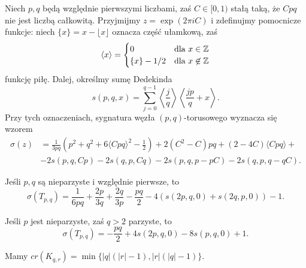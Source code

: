 \begin{proposition}
    Niech $p, q$ będą względnie pierwszymi liczbami, zaś $C \in [0, 1)$ stałą taką, że $Cpq$ nie jest liczbą całkowitą.
    Przyjmijmy $z = \exp (2 \pi i C)$ i zdefinujmy pomocnicze funkcje: niech $\{x\} = x - \lfloor x \rfloor$ oznacza część ułamkową, zaś
    \begin{equation}
        \langle x \rangle = \begin{cases}
            0 & \text{dla } x \in \mathbb Z \\
            \{x\} - 1/2 & \text{dla } x \not \in \mathbb Z
        \end{cases}
    \end{equation}
    funkcję piłę.
    Dalej, określmy sumę Dedekinda
    \begin{equation}
        s(p, q, x) = \sum_{j = 0}^{q-1} \left\langle \frac {j}{q} \right\rangle \left\langle \frac {jp}{q} + x \right\rangle.
    \end{equation}
    Przy tych oznaczeniach, sygnatura węzła $(p, q)$-torusowego wyznacza się wzorem
    \begin{align}
        \sigma(z) & = \frac{1}{3pq} \left (p^2 + q^2 + 6 \langle Cpq \rangle^2 - \frac {1}{2} \right)  + 2(C^2 - C) pq + (2-4C) \langle Cpq \rangle + {} \\
        & - 2s(p, q, Cp) - 2s(q, p, Cq) - 2s(p, q, p-pC) - 2s(q, p, q-qC). \nonumber
    \end{align}
\end{proposition}

\begin{corollary}
    Jeśli $p, q$ są nieparzyste i względnie pierwsze, to
    \begin{equation}
        \sigma(T_{p,q}) = \frac{1}{6pq} + \frac{2p}{3q} + \frac{2q}{3p} - \frac{pq}{2} - 4(s(2p, q, 0) + s(2q, p, 0)) - 1.
    \end{equation}
\end{corollary}

\begin{corollary}
    Jeśli $p$ jest nieparzyste, zaś $q > 2$ parzyste, to
    \begin{equation}
        \sigma(T_{p,q}) = - \frac{pq}{2} + 4s(2p, q, 0) - 8s(p, q, 0) + 1.
    \end{equation}
\end{corollary}

\begin{proposition}[Murasugi, 1991]
    Mamy $cr(K_{q,r}) = \min\{|q|(|r| -1), |r|(|q|-1)\}$.
\end{proposition}

